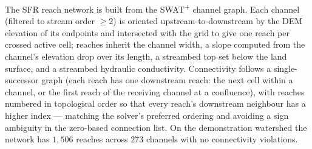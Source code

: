 The SFR reach network is built from the SWAT\textsuperscript{+} channel graph. Each channel
(filtered to stream order $\geq 2$) is oriented upstream-to-downstream by the DEM elevation of its
endpoints and intersected with the grid to give one reach per crossed active cell; reaches inherit
the channel width, a slope computed from the channel's elevation drop over its length, a streambed
top set below the land surface, and a streambed hydraulic conductivity. Connectivity follows a
single-successor graph (each reach has one downstream reach: the next cell within a channel, or the
first reach of the receiving channel at a confluence), with reaches numbered in topological order so
that every reach's downstream neighbour has a higher index --- matching the solver's preferred
ordering and avoiding a sign ambiguity in the zero-based connection list. On the demonstration
watershed the network has $1{,}506$ reaches across $273$ channels with no connectivity violations.
